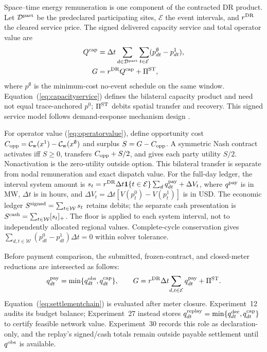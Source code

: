 \documentclass[10pt,journal]{IEEEtran}
\newcommand{\dt}{\Delta t}
\begin{document}
Space--time energy remuneration is one component of the contracted DR
product. Let $\mathcal D^{\rm part}$ be the predeclared participating sites,
$\mathcal E$ the event intervals, and $r^{\rm DR}$ the cleared service price.
The signed delivered capacity service and total operator value are
\begin{align}
 Q^{\rm cap}&=\dt\sum_{d\in\mathcal D^{\rm part}}\sum_{t\in\mathcal E}
 (p^\emptyset_{dt}-p^1_{dt}), \label{eq:capacityservice}\\
 G&=r^{\rm DR}Q^{\rm cap}+\Pi^{\rm ST}, \label{eq:operatorvalue}
\end{align}
where $p^\emptyset$ is the minimum-cost no-event schedule on the same window.
Equation~(\ref{eq:capacityservice}) defines the bilateral capacity product and
need not equal trace-anchored
$p^0$; $\Pi^{\rm ST}$ debits spatial transfer and recovery. This signed service
model follows demand-response mechanism design \cite{satchidanandan2023twostage,chen2021incentive}.

For operator value (\ref{eq:operatorvalue}), define opportunity cost $C_{\rm opp}=\mathcal C_{\rm w}(x^1)-
\mathcal C_{\rm w}(x^\emptyset)$ and surplus $S=G-C_{\rm opp}$. A symmetric
Nash contract \cite{nash1950bargaining} activates iff $S\geq0$, transfers
$C_{\rm opp}+S/2$, and gives each party utility $S/2$. Nonactivation is the
zero-utility outside option. This bilateral transfer is separate from nodal
remuneration and exact dispatch value.
For the full-day ledger, the interval system amount is
$s_t=r^{\rm DR}\dt\mathbf1\{t\in\mathcal E\}\sum_dq^{\rm pay}_{dt}
+\Delta V_t$, where $q^{\rm pay}$ is in MW, $\dt$ is in hours, and
$\Delta V_t=\dt[V(p_t^0)-V(p_t^1)]$ is in USD. The economic ledger
$S^{\rm signed}=\sum_{t\in\mathcal W}s_t$ retains debits; the separate cash
presentation is $S^{\rm cash}=\sum_{t\in\mathcal W}[s_t]_+$. The floor is
applied to each system interval, not to independently allocated regional
values. Complete-cycle conservation gives
$\sum_{d,t\in\mathcal W}(p^0_{dt}-p^1_{dt})\dt=0$ within solver tolerance.

Before payment comparison, the submitted, frozen-contract, and closed-meter
reductions are intersected as follows:
\begin{equation}
q^{\rm pay}_{dt}=\min\{q^{\rm obs}_{dt},q^{\rm cap}_{dt}\},\qquad
 G=r^{\rm DR}\dt\!\sum_{d,t\in\mathcal E}q^{\rm pay}_{dt}+\Pi^{\rm ST}.
\label{eq:settlementchain}
\end{equation}
Equation~(\ref{eq:settlementchain}) is evaluated after meter closure.
Experiment~12 audits its budget balance; Experiment~27 instead stores
$q^{\rm replay}_{dt}=\min\{q^{\rm dec}_{dt},q^{\rm cap}_{dt}\}$ to certify
feasible network value. Experiment~30 records this role as declaration-only, and the
replay's signed/cash totals remain outside payable settlement until
$q^{\rm obs}$ is available.
\end{document}
